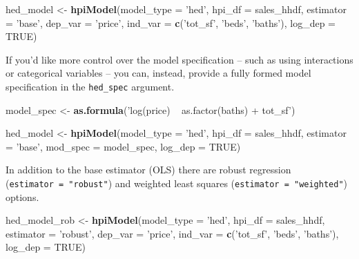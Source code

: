 \documentclass[]{article}
\newenvironment{Shaded}{\begin{snugshade}}{\end{snugshade}}
\newcommand{\KeywordTok}[1]{\textcolor[rgb]{0.13,0.29,0.53}{\textbf{#1}}}
\newcommand{\DataTypeTok}[1]{\textcolor[rgb]{0.13,0.29,0.53}{#1}}
\newcommand{\StringTok}[1]{\textcolor[rgb]{0.31,0.60,0.02}{#1}}
\newcommand{\OtherTok}[1]{\textcolor[rgb]{0.56,0.35,0.01}{#1}}
\newcommand{\NormalTok}[1]{#1}
\begin{document}
\begin{Shaded}
\begin{Highlighting}[]
\NormalTok{  hed_model <-}\StringTok{ }\KeywordTok{hpiModel}\NormalTok{(}\DataTypeTok{model_type =} \StringTok{'hed'}\NormalTok{,}
                        \DataTypeTok{hpi_df =}\NormalTok{ sales_hhdf,}
                        \DataTypeTok{estimator =} \StringTok{'base'}\NormalTok{,}
                        \DataTypeTok{dep_var =} \StringTok{'price'}\NormalTok{,}
                        \DataTypeTok{ind_var =} \KeywordTok{c}\NormalTok{(}\StringTok{'tot_sf'}\NormalTok{, }\StringTok{'beds'}\NormalTok{, }\StringTok{'baths'}\NormalTok{),}
                        \DataTypeTok{log_dep =} \OtherTok{TRUE}\NormalTok{)}
\end{Highlighting}
\end{Shaded}

If you'd like more control over the model specification -- such as using
interactions or categorical variables -- you can, instead, provide a
fully formed model specification in the \texttt{hed\_spec} argument.

\begin{Shaded}
\begin{Highlighting}[]
\NormalTok{  model_spec <-}\StringTok{ }\KeywordTok{as.formula}\NormalTok{(}\StringTok{'log(price) ~ as.factor(baths) + tot_sf'}\NormalTok{)}
  
\NormalTok{  hed_model <-}\StringTok{ }\KeywordTok{hpiModel}\NormalTok{(}\DataTypeTok{model_type =} \StringTok{'hed'}\NormalTok{,}
                        \DataTypeTok{hpi_df =}\NormalTok{ sales_hhdf,}
                        \DataTypeTok{estimator =} \StringTok{'base'}\NormalTok{,}
                        \DataTypeTok{mod_spec =}\NormalTok{ model_spec,}
                        \DataTypeTok{log_dep =} \OtherTok{TRUE}\NormalTok{)}
\end{Highlighting}
\end{Shaded}

In addition to the base estimator (OLS) there are robust regression
(\texttt{estimator\ =\ "robust"}) and weighted least squares
(\texttt{estimator\ =\ "weighted"}) options.

\begin{Shaded}
\begin{Highlighting}[]
\NormalTok{  hed_model_rob <-}\StringTok{ }\KeywordTok{hpiModel}\NormalTok{(}\DataTypeTok{model_type =} \StringTok{'hed'}\NormalTok{,}
                            \DataTypeTok{hpi_df =}\NormalTok{ sales_hhdf,}
                            \DataTypeTok{estimator =} \StringTok{'robust'}\NormalTok{,}
                            \DataTypeTok{dep_var =} \StringTok{'price'}\NormalTok{,}
                            \DataTypeTok{ind_var =} \KeywordTok{c}\NormalTok{(}\StringTok{'tot_sf'}\NormalTok{, }\StringTok{'beds'}\NormalTok{, }\StringTok{'baths'}\NormalTok{),}
                            \DataTypeTok{log_dep =} \OtherTok{TRUE}\NormalTok{)}
\end{Highlighting}
\end{Shaded}
\end{document}

